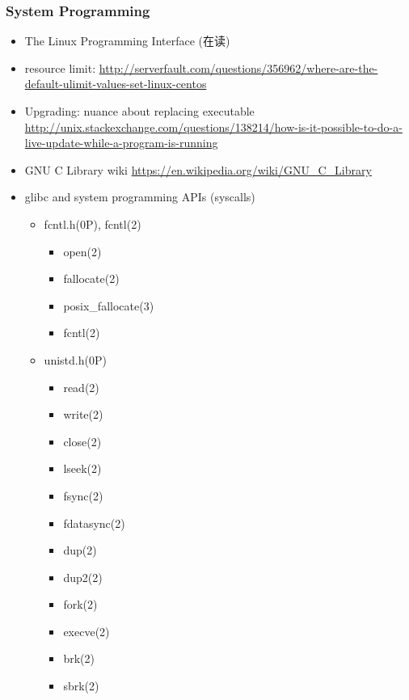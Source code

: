 \documentclass{article}
\begin{document}
\subsubsection{System Programming}
%
\begin{itemize}
    \item The Linux Programming Interface (在读)
    \item resource limit: \url{http://serverfault.com/questions/356962/where-are-the-default-ulimit-values-set-linux-centos}
    \item Upgrading: nuance about replacing executable \url{http://unix.stackexchange.com/questions/138214/how-is-it-possible-to-do-a-live-update-while-a-program-is-running}
    \item GNU C Library wiki \url{https://en.wikipedia.org/wiki/GNU_C_Library}
    \item glibc and system programming APIs (syscalls)
        \begin{itemize}
            \item fcntl.h(0P), fcntl(2)
                \begin{itemize}
                    \item open(2)

                    \item fallocate(2)
                    \item posix_fallocate(3)

                    \item fcntl(2)
                \end{itemize}
            \item unistd.h(0P)
                \begin{itemize}
                    \item read(2)
                    \item write(2)
                    \item close(2)
                    \item lseek(2)
                    \item fsync(2)
                    \item fdatasync(2)

                    \item dup(2)
                    \item dup2(2)

                    \item fork(2)
                    \item execve(2)
                    \item brk(2)
                    \item sbrk(2)


\end{itemize}
\end{itemize}
\end{itemize}
\end{document}
